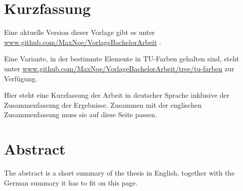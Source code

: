 \thispagestyle{plain}
\section*{Kurzfassung}


Eine aktuelle Version dieser Vorlage gibt es unter \href{https://github.com/MaxNoe/VorlageBachelorArbeit}{www.github.com/MaxNoe/VorlageBachelorArbeit} .

Eine Variante, in der bestimmte Elemente in TU-Farben gehalten sind, steht unter \href{https://github.com/MaxNoe/VorlageBachelorArbeit/tree/tu-farben}{www.github.com/MaxNoe/VorlageBachelorArbeit/tree/tu-farben}  
zur Verfügung.


Hier steht eine Kurzfassung der Arbeit in deutscher Sprache inklusive der Zusammenfassung der
Ergebnisse.
Zusammen mit der englischen Zusammenfassung muss sie auf diese Seite passen.

\section*{Abstract}

The abstract is a short summary of the thesis in English, together with the German summary it has to fit on this page.
